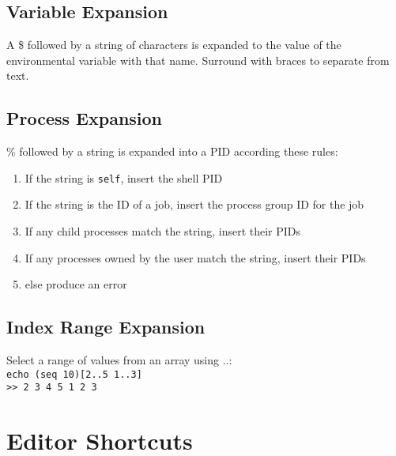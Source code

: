 \documentclass[10pt]{extarticle}
\begin{document}
\begin{paracol}{2}
\subsection*{Variable Expansion}
A \$ followed by a string of characters is expanded to the value of the
environmental variable with that name. Surround with braces to separate from
text.

\subsection*{Process Expansion}
\% followed by a string is expanded into a PID according these rules:

\begin{enumerate}
    \item If the string is \texttt{self}, insert the shell PID
    \item If the string is the ID of a job, insert the process group ID for
        the job
    \item If any child processes match the string, insert their PIDs
    \item If any processes owned by the user match the string, insert their PIDs
    \item else produce an error
\end{enumerate}

\subsection*{Index Range Expansion}
Select a range of values from an array using ..:\\
\texttt{echo (seq 10)[2..5 1..3]}\\
\texttt{>> 2 3 4 5 1 2 3}

\switchcolumn

\section*{Editor Shortcuts}


\end{paracol}
\end{document}
